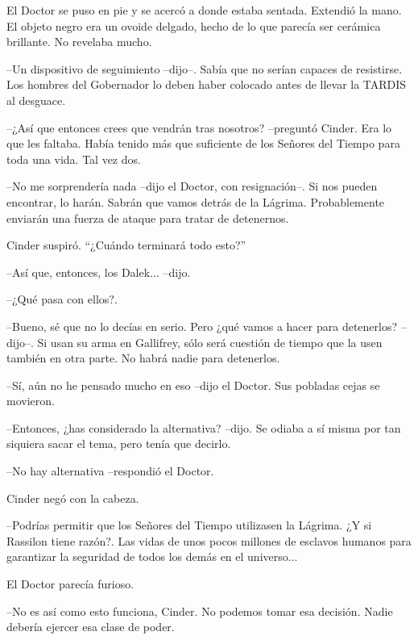 El Doctor se puso en pie y se acercó a donde estaba sentada. Extendió la mano. El objeto negro era un ovoide delgado, hecho de lo que parecía ser cerámica brillante. No revelaba mucho. 



--Un dispositivo de seguimiento --dijo--. Sabía que no serían capaces de resistirse. Los hombres del Gobernador lo deben haber colocado antes de llevar la TARDIS al desguace.

--¿Así que entonces crees que vendrán tras nosotros? --preguntó Cinder. Era lo que les faltaba. Había tenido más que suficiente de los Señores del Tiempo para toda una vida. Tal vez dos.

--No me sorprendería nada --dijo el Doctor, con resignación--. Si nos pueden encontrar, lo harán. Sabrán que vamos detrás de la Lágrima. Probablemente enviarán una fuerza de ataque para tratar de detenernos.



Cinder suspiró. ``¿Cuándo terminará todo esto?'' 



--Así que, entonces, los Dalek... --dijo.

--¿Qué pasa con ellos?.

--Bueno, sé que no lo decías en serio. Pero ¿qué vamos a hacer para detenerlos? --dijo--. Si usan su arma en Gallifrey, sólo será cuestión de tiempo que la usen también en otra parte. No habrá nadie para detenerlos.

--Sí, aún no he pensado mucho en eso --dijo el Doctor. Sus pobladas cejas se movieron.

--Entonces, ¿has considerado la alternativa? --dijo. Se odiaba a sí misma por tan siquiera sacar el tema, pero tenía que decirlo.

--No hay alternativa --respondió el Doctor.



Cinder negó con la cabeza. 



--Podrías permitir que los Señores del Tiempo utilizasen la Lágrima. ¿Y si Rassilon tiene razón?. Las vidas de unos pocos millones de esclavos humanos para garantizar la seguridad de todos los demás en el universo...



El Doctor parecía furioso. 

--No es así como esto funciona, Cinder. No podemos tomar esa decisión. Nadie debería ejercer esa clase de poder.

